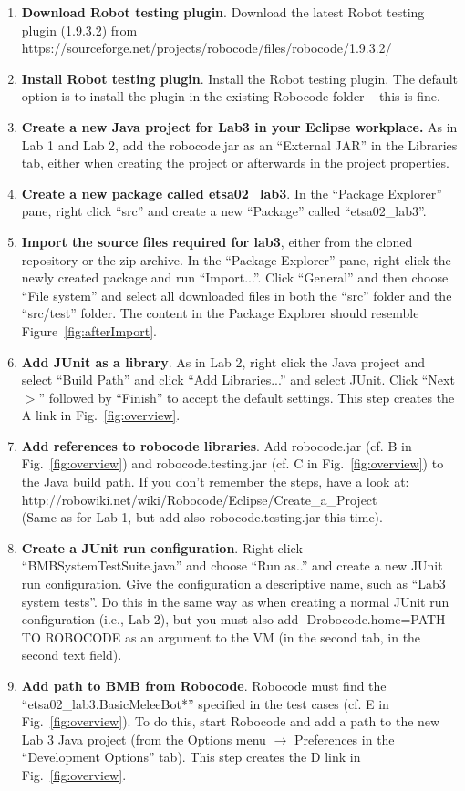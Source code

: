 \documentclass{scrreprt}
\begin{document}
\begin{enumerate}
\item \textbf{Download Robot testing plugin}. Download the latest Robot testing plugin (1.9.3.2) from https://sourceforge.net/projects/robocode/files/robocode/1.9.3.2/
\item \textbf{Install Robot testing plugin}. Install the Robot testing plugin. The default option is to install the plugin in the existing Robocode folder -- this is fine.
\item \textbf{Create a new Java project for Lab3 in your Eclipse workplace.} As in Lab 1 and Lab 2, add the robocode.jar as an ``External JAR'' in the Libraries tab, either when creating the project or afterwards in the project properties.
\item \textbf{Create a new package called etsa02_lab3}. In the ``Package Explorer'' pane, right click ``src'' and create a new ``Package'' called ``etsa02_lab3''.
\item \textbf{Import the source files required for lab3}, either from the cloned repository or the zip archive. In the ``Package Explorer'' pane, right click the newly created package and run ``Import...''. Click ``General'' and then choose ``File system'' and select all downloaded files in both the ``src'' folder and the ``src/test'' folder. The content in the Package Explorer should resemble Figure~\ref{fig:afterImport}.
\item \textbf{Add JUnit as a library}. As in Lab 2, right click the Java project and select ``Build Path'' and click ``Add Libraries...'' and select JUnit. Click ``Next $>$'' followed by ``Finish'' to accept the default settings. This step creates the A link in Fig.~\ref{fig:overview}.
\item \textbf{Add references to robocode libraries}. Add robocode.jar (cf. B in Fig.~\ref{fig:overview}) and robocode.testing.jar (cf. C in Fig.~\ref{fig:overview}) to the Java build path. If you don't remember the steps, have a look at:\\http://robowiki.net/wiki/Robocode/Eclipse/Create_a_Project\\(Same as for Lab 1, but add also robocode.testing.jar this time).
\item \textbf{Create a JUnit run configuration}. Right click ``BMBSystemTestSuite.java'' and choose ``Run as..'' and create a new JUnit run configuration. Give the configuration a descriptive name, such as ``Lab3 system tests''. Do this in the same way as when creating a normal JUnit run configuration (i.e., Lab 2), but you must also add -Drobocode.home=PATH TO ROBOCODE as an argument to the VM (in the second tab, in the second text field).
\item \textbf{Add path to BMB from Robocode}. Robocode must find the ``etsa02_lab3.BasicMeleeBot*'' specified in the test cases (cf. E in Fig.~\ref{fig:overview}). To do this, start Robocode and add a path to the new Lab 3 Java project (from the Options menu $\rightarrow$ Preferences in the ``Development Options'' tab). This step creates the D link in Fig.~\ref{fig:overview}.
\end{enumerate}
\end{document}
